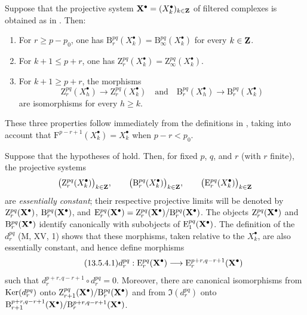 \begin{lemma}[13.5.3]
\label{0.13.5.3}
Suppose that the projective system
$\mathbf{X}^\bullet=(X^\bullet_k)_{k\in\mathbf{Z}}$ of filtered complexes is
obtained as in \textup{}. Then:
\begin{enumerate}
  \item[{\rm a)}] For $r\geq p-p_0$, one has $\mathrm{B}_r^{pq}(X^\bullet_k)
=
\mathrm{B}_\infty^{pq}(X^\bullet_k)$
  for every $k\in\mathbf{Z}$.
  \item[{\rm b)}] For $k+1\leq p+r$, one has $\mathrm{Z}_r^{pq}(X^\bullet_k)
=
\mathrm{Z}_\infty^{pq}(X^\bullet_k)$.
  \item[{\rm c)}] For $k+1\geq p+r$, the morphisms
  \[
    \mathrm{Z}_r^{pq}(X^\bullet_h)
    \longrightarrow
    \mathrm{Z}_r^{pq}(X^\bullet_k)
    \quad\text{and}\quad
    \mathrm{B}_r^{pq}(X^\bullet_h)
    \longrightarrow
    \mathrm{B}_r^{pq}(X^\bullet_k)
  \]
  are isomorphisms for every $h\geq k$.
\end{enumerate}
\end{lemma}

These three properties follow immediately from the definitions in
, taking into account that
$\mathrm{F}^{p-r+1}(X^\bullet_k)=X^\bullet_k$ when $p-r<p_0$.

\begin{env}[13.5.4]
\label{0.13.5.4}
Suppose that the hypotheses of  hold.
Then, for fixed $p$, $q$, and $r$ (with $r$ finite), the projective
systems
\[
  \bigl(\mathrm{Z}_r^{pq}(X^\bullet_k)\bigr)_{k\in\mathbf{Z}},
  \qquad
  \bigl(\mathrm{B}_r^{pq}(X^\bullet_k)\bigr)_{k\in\mathbf{Z}},
  \qquad
  \bigl(\mathrm{E}_r^{pq}(X^\bullet_k)\bigr)_{k\in\mathbf{Z}}
\]
are \emph{essentially constant}; their respective projective limits
will be denoted by
$\mathrm{Z}_r^{pq}(\mathbf{X}^\bullet)$,
$\mathrm{B}_r^{pq}(\mathbf{X}^\bullet)$, and $\mathrm{E}_r^{pq}(\mathbf{X}^\bullet)
=
\mathrm{Z}_r^{pq}(\mathbf{X}^\bullet)/
\mathrm{B}_r^{pq}(\mathbf{X}^\bullet)$.
The objects $\mathrm{Z}_r^{pq}(\mathbf{X}^\bullet)$ and
$\mathrm{B}_r^{pq}(\mathbf{X}^\bullet)$ identify canonically with
subobjects of $\mathrm{E}_1^{pq}(\mathbf{X}^\bullet)$.
The definition of the $d_r^{pq}$ (M, XV, 1) shows that these
morphisms, taken relative to the $X^\bullet_k$, are also essentially
constant, and hence define morphisms
\begin{equation}
\label{0.13.5.4.1}
\tag{13.5.4.1}
  d_r^{pq}:
  \mathrm{E}_r^{pq}(\mathbf{X}^\bullet)
  \longrightarrow
  \mathrm{E}_r^{p+r,q-r+1}(\mathbf{X}^\bullet)
\end{equation}
such that
$d_r^{p+r,q-r+1}\circ d_r^{pq}=0$.
Moreover, there are canonical isomorphisms from
$\operatorname{Ker}(d_r^{pq})$ onto $\mathrm{Z}_{r+1}^{pq}(\mathbf{X}^\bullet)/
\mathrm{B}_r^{pq}(\mathbf{X}^\bullet)$
and from $\Im(d_r^{pq})$ onto $\mathrm{B}_{r+1}^{p+r,q-r+1}(\mathbf{X}^\bullet)/
\mathrm{B}_r^{p+r,q-r+1}(\mathbf{X}^\bullet)$.
\end{env}

